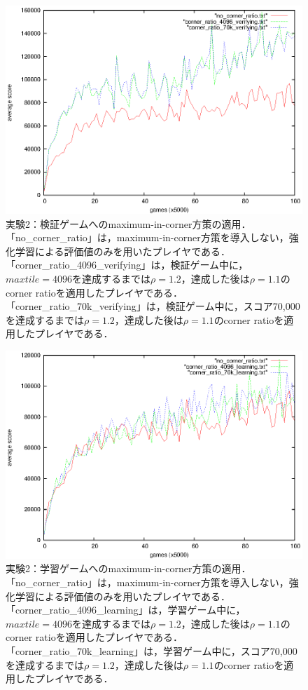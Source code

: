 \documentclass{suribt}
\begin{document}
\begin{figure}[tb]
	\begin{center}
	\includegraphics[width=13cm]{figure_007.eps}
	\caption{実験2：検証ゲームへのmaximum-in-corner方策の適用．「no\_corner\_ratio」は，maximum-in-corner方策を導入しない，強化学習による評価値のみを用いたプレイヤである．「corner\_ratio\_4096\_verifying」は，検証ゲーム中に，$maxtile=4096$を達成するまでは${\rho}=1.2$，達成した後は${\rho}=1.1$のcorner ratioを適用したプレイヤである．「corner\_ratio\_70k\_verifying」は，検証ゲーム中に，スコア70,000を達成するまでは${\rho}=1.2$，達成した後は${\rho}=1.1$のcorner ratioを適用したプレイヤである．}
	\label{figure_007}
	\end{center}
\end{figure}

\begin{figure}[tb]
	\begin{center}
	\includegraphics[width=13cm]{figure_008.eps}
	\caption{実験2：学習ゲームへのmaximum-in-corner方策の適用．「no\_corner\_ratio」は，maximum-in-corner方策を導入しない，強化学習による評価値のみを用いたプレイヤである．「corner\_ratio\_4096\_learning」は，学習ゲーム中に，$maxtile=4096$を達成するまでは${\rho}=1.2$，達成した後は${\rho}=1.1$のcorner ratioを適用したプレイヤである．「corner\_ratio\_70k\_learning」は，学習ゲーム中に，スコア70,000を達成するまでは${\rho}=1.2$，達成した後は${\rho}=1.1$のcorner ratioを適用したプレイヤである．}
	\label{figure_008}
	\end{center}
\end{figure}
\end{document}
